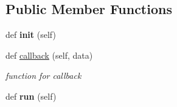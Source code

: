 \subsection*{Public Member Functions}
\begin{DoxyCompactItemize}
\item 
def {\bfseries init} (self)\hypertarget{classRecorder__IMU_1_1RecorderImu_adec0cb42c96808ab230f12f43d501340}{}\label{classRecorder__IMU_1_1RecorderImu_adec0cb42c96808ab230f12f43d501340}

\item 
def \hyperlink{classRecorder__IMU_1_1RecorderImu_af8e247022237f2712529d30f1669f996}{callback} (self, data)\hypertarget{classRecorder__IMU_1_1RecorderImu_af8e247022237f2712529d30f1669f996}{}\label{classRecorder__IMU_1_1RecorderImu_af8e247022237f2712529d30f1669f996}

\begin{DoxyCompactList}\small\item\em function for callback \end{DoxyCompactList}\item 
def {\bfseries run} (self)\hypertarget{classRecorder__IMU_1_1RecorderImu_a0a12c640019bac34c7ba3511d91e81de}{}\label{classRecorder__IMU_1_1RecorderImu_a0a12c640019bac34c7ba3511d91e81de}

\end{DoxyCompactItemize}
